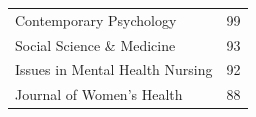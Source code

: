 \documentclass[]{tufte-handout}
\begin{document}
\begin{longtable}[]{@{}lr@{}}
\begin{minipage}[t]{0.60\columnwidth}\raggedright\strut
Contemporary Psychology\strut
\end{minipage} & \begin{minipage}[t]{0.09\columnwidth}\raggedleft\strut
99\strut
\end{minipage}\tabularnewline
\begin{minipage}[t]{0.60\columnwidth}\raggedright\strut
Social Science \& Medicine\strut
\end{minipage} & \begin{minipage}[t]{0.09\columnwidth}\raggedleft\strut
93\strut
\end{minipage}\tabularnewline
\begin{minipage}[t]{0.60\columnwidth}\raggedright\strut
Issues in Mental Health Nursing\strut
\end{minipage} & \begin{minipage}[t]{0.09\columnwidth}\raggedleft\strut
92\strut
\end{minipage}\tabularnewline
\begin{minipage}[t]{0.60\columnwidth}\raggedright\strut
Journal of Women's Health\strut
\end{minipage} & \begin{minipage}[t]{0.09\columnwidth}\raggedleft\strut
88\strut
\end{minipage}\tabularnewline
\bottomrule
\end{longtable}
\end{document}
